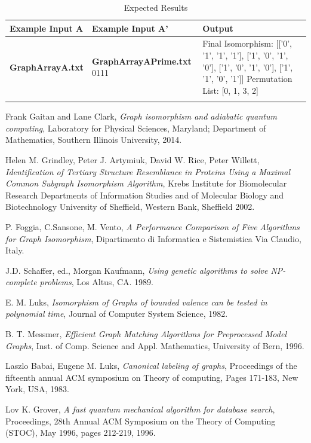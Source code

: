 \documentclass[12pt]{article}
\begin{document}
\begin{table}[b!]
\begin{tabularx}{\textwidth}{@{} Y Y Y @{}} %
\toprule
Example Input A & Example Input A' & Output \\
\midrule
\textbf{GraphArrayA.txt} & 
\textbf{GraphArrayAPrime.txt}
0111 & 
Final Isomorphism:
[['0', '1', '1', '1'], ['1', '0', '1', '0'], ['1', '0', '1', '0'], ['1', '1', '0', '1']]\newline
Permutation List:
[0, 1, 3, 2] \\ \addlinespace
\bottomrule
\end{tabularx}
\caption{Expected Results} 
\label{table:nonlin}
\end{table}

\doublespace

\newpage
\begin{thebibliography}{9}
  Frank Gaitan and Lane Clark,
  \emph{Graph isomorphism and adiabatic quantum computing},
  Laboratory for Physical Sciences, Maryland;
  Department of Mathematics, Southern Illinois University,
  2014.

  Helen M. Grindley, Peter J. Artymiuk, David W. Rice, Peter Willett,
  \emph{Identification of Tertiary Structure Resemblance in Proteins Using a Maximal Common Subgraph Isomorphism Algorithm},
  Krebs Institute for Biomolecular Research Departments of Information Studies and of Molecular Biology and Biotechnology University of Sheffield, Western Bank, Sheffield
  2002.

  P. Foggia, C.Sansone, M. Vento,
  \emph{A Performance Comparison of Five Algorithms for Graph Isomorphism},
  Dipartimento di Informatica e Sistemistica Via Claudio, Italy.

  J.D. Schaffer, ed., Morgan Kaufmann,
  \emph{Using genetic algorithms to solve NP-complete problems},
  Los Altus, CA.
  1989.
  
   E. M. Luks,
  \emph{Isomorphism of Graphs of bounded valence can be tested in polynomial time},
  Journal of Computer System Science,
  1982.

   B. T. Messmer,
  \emph{Efficient Graph Matching Algorithms for Preprocessed Model Graphs},
  Inst. of Comp. Science and Appl. Mathematics, University of Bern,
  1996.
  
   Laszlo Babai,	
Eugene M. Luks,
  \emph{Canonical labeling of graphs},
  Proceedings of the fifteenth annual ACM symposium on Theory of computing, Pages 171-183, New York, USA,
  1983.
  
  Lov K. Grover,
  \emph{A fast quantum mechanical algorithm for database search},
  Proceedings, 28th Annual ACM Symposium on the Theory of Computing (STOC), May 1996, pages  212-219,
  1996.
  
\end{thebibliography}
\end{document}
